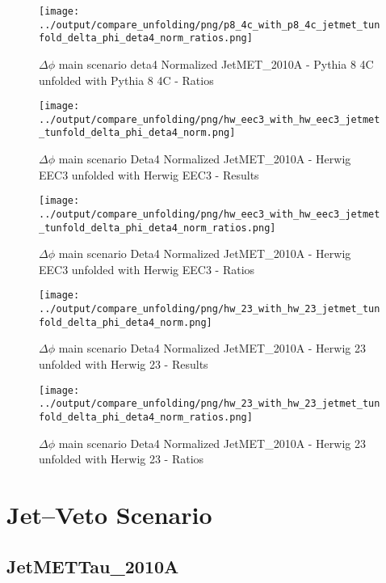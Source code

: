 \documentclass[11pt]{book}
\begin{document}
\begin{figure}[ht]
\centering
\texttt{[image: ../output/compare\_unfolding/png/p8\_4c\_with\_p8\_4c\_jetmet\_tunfold\_delta\_phi\_deta4\_norm\_ratios.png]}
\caption{$\Delta\phi$ main scenario deta4 Normalized JetMET\_2010A - Pythia 8 4C unfolded with Pythia 8 4C - Ratios}
\label{p8_p8_jetmet_tunfold_delta_phi_deta4_norm_b}
\end{figure}

\begin{figure}[ht]
\centering
\texttt{[image: ../output/compare\_unfolding/png/hw\_eec3\_with\_hw\_eec3\_jetmet\_tunfold\_delta\_phi\_deta4\_norm.png]}
\caption{$\Delta\phi$ main scenario Deta4 Normalized JetMET\_2010A - Herwig EEC3 unfolded with Herwig EEC3 - Results}
\label{hw_eec3_hw_eec3_jetmet_tunfold_delta_phi_deta4_norm_a}
\end{figure}

\begin{figure}[ht]
\centering
\texttt{[image: ../output/compare\_unfolding/png/hw\_eec3\_with\_hw\_eec3\_jetmet\_tunfold\_delta\_phi\_deta4\_norm\_ratios.png]}
\caption{$\Delta\phi$ main scenario Deta4 Normalized JetMET\_2010A - Herwig EEC3 unfolded with Herwig EEC3 - Ratios}
\label{hw_eec3_hw_eec3_jetmet_tunfold_delta_phi_deta4_norm_b}
\end{figure}

\begin{figure}[ht]
\centering
\texttt{[image: ../output/compare\_unfolding/png/hw\_23\_with\_hw\_23\_jetmet\_tunfold\_delta\_phi\_deta4\_norm.png]}
\caption{$\Delta\phi$ main scenario Deta4 Normalized JetMET\_2010A - Herwig 23 unfolded with Herwig 23 - Results}
\label{hw_23_hw_23_jetmet_tunfold_delta_phi_deta4_norm_a}
\end{figure}

\begin{figure}[ht]
\centering
\texttt{[image: ../output/compare\_unfolding/png/hw\_23\_with\_hw\_23\_jetmet\_tunfold\_delta\_phi\_deta4\_norm\_ratios.png]}
\caption{$\Delta\phi$ main scenario Deta4 Normalized JetMET\_2010A - Herwig 23 unfolded with Herwig 23 - Ratios}
\label{hw_23_hw_23_jetmet_tunfold_delta_phi_deta4_norm_b}
\end{figure}


\cleardoublepage
\chapter{Jet--Veto Scenario}
\section{JetMETTau\_2010A}
\end{document}
